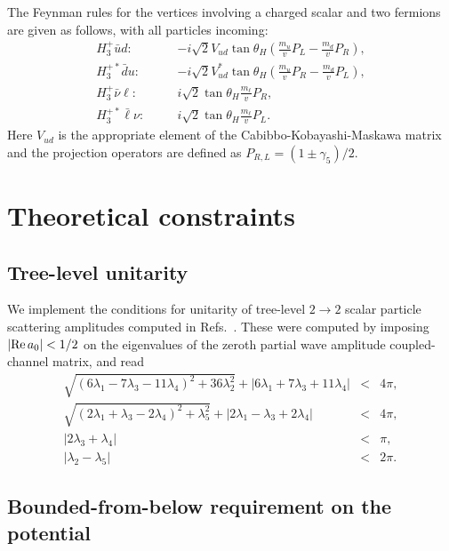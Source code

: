 \documentclass[11pt]{article}
\begin{document}
The Feynman rules for the vertices involving a charged scalar and two fermions are given as follows, with all particles incoming:
\begin{eqnarray}
	H_3^+ \bar u d: &\quad& -i \sqrt{2} V_{ud} \tan\theta_H
		\left( \frac{m_u}{v} P_L - \frac{m_d}{v} P_R \right), \nonumber \\
	H_3^{+*} \bar d u: &\quad& -i \sqrt{2} V_{ud}^* \tan\theta_H 
		\left( \frac{m_u}{v} P_R - \frac{m_d}{v} P_L \right), \nonumber \\
	H_3^+ \bar \nu \ell: &\quad& i \sqrt{2} \tan\theta_H \frac{m_{\ell}}{v} P_R, \nonumber \\
	H_3^{+*} \bar \ell \nu: &\quad& i \sqrt{2} \tan\theta_H \frac{m_{\ell}}{v} P_L.
\end{eqnarray}
Here $V_{ud}$ is the appropriate element of the Cabibbo-Kobayashi-Maskawa matrix and the projection operators are defined as $P_{R,L} = (1 \pm \gamma_5)/2$.  


\section{Theoretical constraints}
\label{sec:thy}

\subsection{Tree-level unitarity}

We implement the conditions for unitarity of tree-level $2\to 2$ scalar particle scattering amplitudes computed in Refs.~\cite{Aoki:2007ah,HKL}.  These were computed by imposing $|{\rm Re}\, a_0| < 1/2$ on the eigenvalues of the zeroth partial wave amplitude coupled-channel matrix, and read
\begin{eqnarray}
	\sqrt{ \left( 6 \lambda_1 - 7 \lambda_3 - 11 \lambda_4 \right)^2 + 36 \lambda_2^2}
	+ \left| 6 \lambda_1 + 7 \lambda_3 + 11 \lambda_4 \right| &<& 4 \pi, \nonumber \\
	\sqrt{ \left( 2 \lambda_1 + \lambda_3 - 2 \lambda_4 \right)^2 + \lambda_5^2}
	+ \left| 2 \lambda_1 - \lambda_3 + 2 \lambda_4 \right| &<& 4 \pi, \nonumber \\
	\left| 2 \lambda_3 + \lambda_4 \right| &<& \pi, \nonumber \\
	\left| \lambda_2 - \lambda_5 \right| &<& 2 \pi.
	\label{eq:uni}
\end{eqnarray}

\subsection{Bounded-from-below requirement on the potential}
\end{document}
